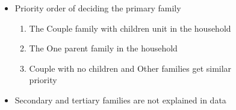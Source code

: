 \begin{frame}
\begin{columns}[T]
\begin{column}{0.98\textwidth}
\begin{itemize}
  \end{itemize}%
\end{column}%
\end{columns}%
\vspace{1em}
  \begin{columns}[T] %
    \begin{column}{.7\textwidth}%
       \begin{itemize}%
        \setlength\itemsep{1em} %
        \item Priority order of deciding the primary family%
        \begin{enumerate}%
          \setlength\itemsep{0.5em}%
          \item The Couple family with children unit in the household %
          \item The One parent family in the household%
          \item Couple with no children and Other families get similar
          priority %
        \end{enumerate} %
        \item     Secondary and tertiary families are not explained in data%
      \end{itemize}%
    \end{column}%
       \begin{column}{.29\textwidth}%
        \begin{figure}
\centering

\end{figure}
\end{column}
\end{columns}
\end{frame}
